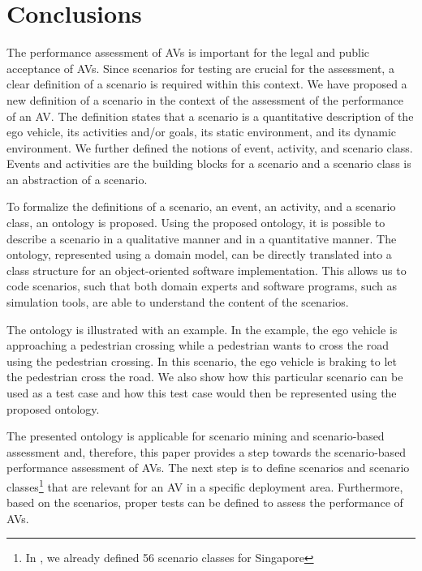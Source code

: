 \cbstart
\section{Conclusions}
\label{sec:conclusion}

The performance assessment of AVs is important for the legal and public acceptance of AVs. 
Since scenarios for testing are crucial for the assessment, a clear definition of a scenario is required within this context. 
We have proposed a new definition of a scenario in the context of the assessment of the performance of an AV. 
The definition states that a scenario is a quantitative description of the ego vehicle, its activities and/or goals, its static environment, and its dynamic environment. 
We further defined the notions of event, activity, and scenario class. Events and activities are the building blocks for a scenario and a scenario class is an abstraction of a scenario.

To formalize the definitions of a scenario, an event, an activity, and a scenario class, an ontology is proposed. Using the proposed ontology, it is possible to describe a scenario in a qualitative manner and in a quantitative manner. The ontology, represented using a domain model, can be directly translated into a class structure for an object-oriented software implementation. This allows us to code scenarios, such that both domain experts and software programs, such as simulation tools, are able to understand the content of the scenarios. 

The ontology is illustrated with an example. In the example, the ego vehicle is approaching a pedestrian crossing while a pedestrian wants to cross the road using the pedestrian crossing. In this scenario, the ego vehicle is braking to let the pedestrian cross the road. We also show how this particular scenario can be used as a test case and how this test case would then be represented using the proposed ontology.

The presented ontology is applicable for scenario mining and scenario-based assessment and, therefore, this paper provides a step towards the scenario-based performance assessment of AVs. The next step is to define scenarios and scenario classes\footnote{\cbstart In \cite{degelder2019scenarioclasses}, we already defined 56 scenario classes for Singapore\cbend} that are relevant for an AV in a specific deployment area. Furthermore, based on the scenarios, proper tests can be defined to assess the performance of AVs. 
\cbend
